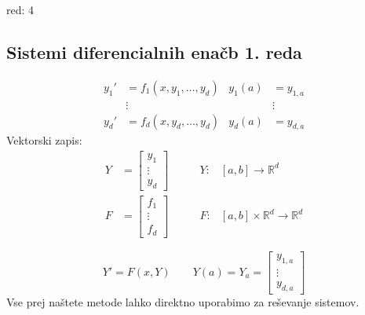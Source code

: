 \begin{multicols}{5}
\begin{center}
\begin{tabular}[]{c | c c c c}
    \end{tabular}
\end{center}
red: 4

\subsection*{Sistemi diferencialnih enačb 1. reda}
\begin{align*}
    y_1' &= f_1(x, y_1, \dots, y_d) & y_1(a) &= y_{1,a} \\
        &\vdots                     &        &\vdots \\
    y_d' &= f_d(x, y_d, \dots, y_d) & y_d(a) &= y_{d,a}
\end{align*}
Vektorski zapis:
\begin{align*}
    Y &= \begin{bmatrix}
        y_1 \\
        \vdots \\
        y_d
    \end{bmatrix}
    &\qquad
    Y:& [a,b] \to \mathbb{R}^d \\
    F &= \begin{bmatrix}
        f_1 \\
        \vdots \\
        f_d
    \end{bmatrix}
    &\qquad
    F:& [a,b] \times \mathbb{R}^d  \to \mathbb{R}^d 
\end{align*}

\[ Y' = F(x, Y) \qquad Y(a) = Y_a = \begin{bmatrix}
    y_{1,a} \\
    \vdots \\
    y_{d,a}
\end{bmatrix}\]
Vse prej naštete metode lahko direktno uporabimo za reševanje sistemov.


\end{multicols}
